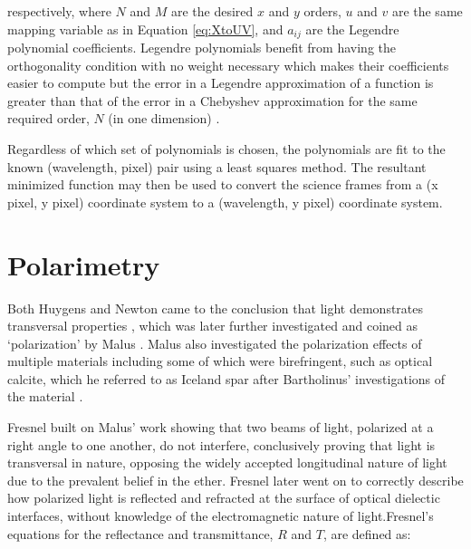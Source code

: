 \noindent respectively, where $N$ and $M$ are the desired $x$ and $y$ orders, $u$ and $v$ are the same mapping variable as in Equation \ref{eq:XtoUV}, and $a_{ij}$ are the Legendre polynomial coefficients. Legendre polynomials benefit from having the orthogonality condition with no weight necessary which makes their coefficients easier to compute but the error in a Legendre approximation of a function is greater than that of the error in a Chebyshev approximation for the same required order, $N$ (in one dimension) \citep{leg_cheb_relation}.
\prgph

Regardless of which set of polynomials is chosen, the polynomials are fit to the known (wavelength, pixel) pair using a least squares method. The resultant minimized function may then be used to convert the science frames from a (x pixel, y pixel) coordinate system to a (wavelength, y pixel) coordinate system.
\prgph


\section{Polarimetry}

Both Huygens and Newton came to the conclusion that light demonstrates transversal properties \citep{Huygens, opticks}, which was later further investigated and coined as `polarization' by Malus \citep{Pol_Malus}. Malus also investigated the polarization effects of multiple materials including some of which were birefringent, such as optical calcite, which he referred to as Iceland spar after Bartholinus' investigations of the material \citep{Bartholinus}.

\prgph

Fresnel built on Malus' work showing that two beams of light, polarized at a right angle to one another, do not interfere, conclusively proving that light is transversal in nature, opposing the widely accepted longitudinal nature of light due to the prevalent belief in the ether. Fresnel later went on to correctly describe how polarized light is reflected and refracted at the surface of optical dielectic interfaces, without knowledge of the electromagnetic nature of light.Fresnel's equations for the reflectance and transmittance, $R$ and $T$, are defined as:

